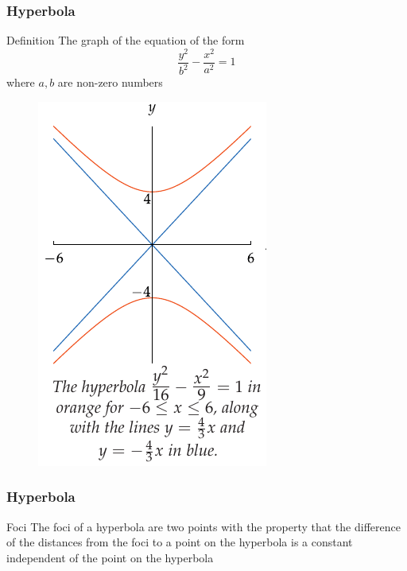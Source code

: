 \documentclass{beamer}
\begin{document}
\begin{frame}
  \frametitle{Hyperbola}
\begin{block}{Definition}
  The graph of the equation of the form 
  \[
\frac{y^2}{b^2} - \frac{x^2}{a^2} = 1
\]
where \(a,b\) are non-zero numbers
\end{block}
\end{frame}

\begin{frame}
  \begin{figure}
    \centering 
    \includegraphics[scale=0.5]{hyperbola2.png}
  \end{figure}
\end{frame}
\begin{frame}
  \frametitle{Hyperbola}
  \begin{block}{Foci}
    The foci of a hyperbola are two points with the property that the difference of
the distances from the foci to a point on the hyperbola is a constant independent
of the point on the hyperbola
  \end{block}
\end{frame}
\end{document}

